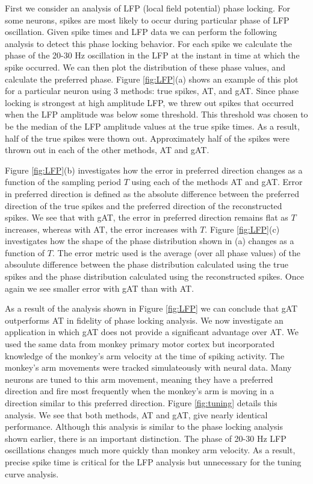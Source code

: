 \documentclass[journal]{IEEEtran}
\begin{document}
First we consider an analysis of LFP (local field potential) phase locking. For some neurons, spikes are most likely to occur during particular phase of LFP oscillation. Given spike times and LFP data we can perform the following analysis to detect this phase locking behavior. For each spike we calculate the phase of the 20-30 Hz oscillation in the LFP at the instant in time at which the spike occurred. We can then plot the distribution of these phase values, and calculate the preferred phase. Figure \ref{fig:LFP}(a) shows an example of this plot for a particular neuron using 3 methods: true spikes, AT, and gAT. Since phase locking is strongest at high amplitude LFP, we threw out spikes that occurred when the LFP amplitude was below some threshold. This threshold was chosen to be the median of the LFP amplitude values at the true spike times. As a result, half of the true spikes were thown out. Approximately half of the spikes were thrown out in each of the other methods, AT and gAT.

Figure \ref{fig:LFP}(b) investigates how the error in preferred direction changes as a function of the sampling period $T$ using each of the methods AT and gAT. Error in preferred direction is defined as the absolute difference between the preferred direction of the true spikes and the preferred direction of the reconstructed spikes. We see that with gAT, the error in preferred direction remains flat as $T$ increases, whereas with AT, the error increases with $T$. Figure \ref{fig:LFP}(c) investigates how the shape of the phase distribution shown in (a) changes as a function of $T$. The error metric used is the average (over all phase values) of the absoulute difference between the phase distribution calculated using the true spikes and the phase distribution calculated using the reconstructed spikes. Once again we see smaller error with gAT than with AT.

As a result of the analysis shown in Figure \ref{fig:LFP} we can conclude that gAT outperforms AT in fidelity of phase locking analysis. We now investigate an application in which gAT does not provide a significant advantage over AT. We used the same data from monkey primary motor cortex but incorporated knowledge of the monkey's arm velocity at the time of spiking activity. The monkey's arm movements were tracked simulateously with neural data. Many neurons are tuned to this arm movement, meaning they have a preferred direction and fire most frequently when the monkey's arm is moving in a direction similar to this preferred direction. Figure \ref{fig:tuning} details this analysis. We see that both methods, AT and gAT, give nearly identical performance. Although this analysis is similar to the phase locking analysis shown earlier, there is an important distinction. The phase of 20-30 Hz LFP oscillations changes much more quickly than monkey arm velocity. As a result, precise spike time is critical for the LFP analysis but unnecessary for the tuning curve analysis.
\end{document}
